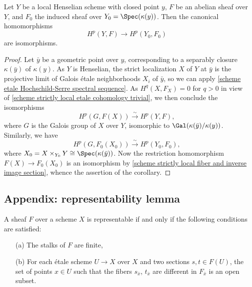 \begin{corollary}\label{scheme local Henselian etale cohomology to closed point}
Let $Y$ be a local Henselian scheme with closed point $y$, $F$ be an abelian sheaf over $Y$, and $F_0$ the induced sheaf over $Y_0=\Spec(\kappa(y))$. Then the canonical homomorphisms
\[H^p(Y,F)\to H^p(Y_0,F_0)\]
are isomorphisms.
\end{corollary}
\begin{proof}
Let $\bar{y}$ be a geometric point over $y$, corresponding to a separably closure $\kappa(\bar{y})$ of $\kappa(y)$. As $Y$ is Henselian, the strict localization $X$ of $Y$ at $\bar{y}$ is the projective limit of Galois \'etale neighborhoods $X_i$ of $\bar{y}$, so we can apply \cref{scheme etale Hochschild-Serre spectral sequence}. As $H^q(X,F_X)=0$ for $q>0$ in view of \cref{scheme strictly local etale cohomology trivial}, we then conclude the isomorphisms
\[H^p(G,F(X)) \stackrel{\sim}{\to} H^p(Y,F),\]
where $G$ is the Galois group of $X$ over $Y$, isomorphic to $\Gal(\kappa(\bar{y})/\kappa(y))$. Similarly, we have
\[H^p(G,F_0(X_0)) \stackrel{\sim}{\to} H^p(Y_0,F_0),\]
where $X_0=X\times_{Y_0}Y\cong\Spec(\kappa(\bar{y}))$. Now the restriction homomorphism $F(X)\to F_0(X_0)$ is an isomorphism by \cref{scheme strictly local fiber and inverse image section}, whence the assertion of the corollary.
\end{proof}
\subsection{Appendix: representability lemma}
\begin{lemma}\label{scheme etale representability lemma}
A sheaf $F$ over a scheme $X$ is representable if and only if the following conditions are satisfied:
\begin{enumerate}
    \item[(a)] The stalks of $F$ are finite,
    \item[(b)] For each \'etale scheme $U\to X$ over $X$ and two sections $s,t\in F(U)$, the set of points $x\in U$ such that the fibers $s_{\bar{x}}$, $t_{\bar{x}}$ are different in $F_{\bar{x}}$ is an open subset.
\end{enumerate}
\end{lemma}

